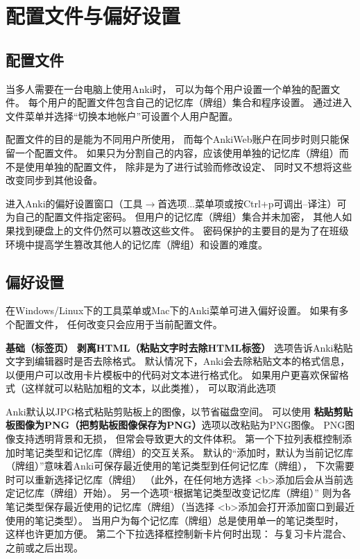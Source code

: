 \documentclass[a4paper]{book}
\begin{document}
\chapter{配置文件与偏好设置}\label{}

\section{配置文件}

当多人需要在一台电脑上使用Anki时， 可以为每个用户设置一个单独的配置文件。 每个用户的配置文件包含自己的记忆库（牌组）集合和程序设置。 通过进入文件菜单并选择“切换本地帐户”可设置个人用户配置。

\begin{shaded}
	配置文件的目的是能为不同用户所使用， 而每个AnkiWeb账户在同步时则只能保留一个配置文件。 如果只为分割自己的内容，应该使用单独的记忆库（牌组）而不是使用单独的配置文件， 除非是为了进行试验而修改设定、 同时又不想将这些改变同步到其他设备。
\end{shaded}

进入Anki的偏好设置窗口（工具$\to$首选项...菜单项或按Ctrl+p可调出--译注）可为自己的配置文件指定密码。 但用户的记忆库（牌组）集合并未加密， 其他人如果找到硬盘上的文件仍然可以篡改这些文件。 密码保护的主要目的是为了在班级环境中提高学生篡改其他人的记忆库（牌组）和设置的难度。

\section{偏好设置}
在Windows/Linux下的工具菜单或Mac下的Anki菜单可进入偏好设置。 如果有多个配置文件， 任何改变只会应用于当前配置文件。

\textbf{基础（标签页）}
\textbf{剥离HTML（粘贴文字时去除HTML标签）} 选项告诉Anki粘贴文字到编辑器时是否去除格式。 默认情况下，Anki会去除粘贴文本的格式信息， 以便用户可以改用卡片模板中的代码对文本进行格式化。 如果用户更喜欢保留格式（这样就可以粘贴加粗的文本，以此类推）， 可以取消此选项

Anki默认以JPG格式粘贴剪贴板上的图像，以节省磁盘空间。 可以使用
\textbf{粘贴剪贴板图像为PNG（把剪贴板图像保存为PNG）}选项以改粘贴为PNG图像。 PNG图像支持透明背景和无损， 但常会导致更大的文件体积。
第一个下拉列表框控制添加时笔记类型和记忆库（牌组）的交互关系。 默认的“添加时，默认为当前记忆库（牌组）”意味着Anki可保存最近使用的笔记类型到任何记忆库（牌组）， 下次需要时可以重新选择记忆库（牌组） （此外，在任何地方选择
<b>添加后会从当前选定记忆库（牌组）开始）。 另一个选项“根据笔记类型改变记忆库（牌组）” 则为各笔记类型保存最近使用的记忆库（牌组）（当选择
<b>添加会打开添加窗口到最近使用的笔记类型）。 当用户为每个记忆库（牌组）总是使用单一的笔记类型时， 这样也许更加方便。
第二个下拉选择框控制新卡片何时出现： 与复习卡片混合、之前或之后出现。
\end{document}
